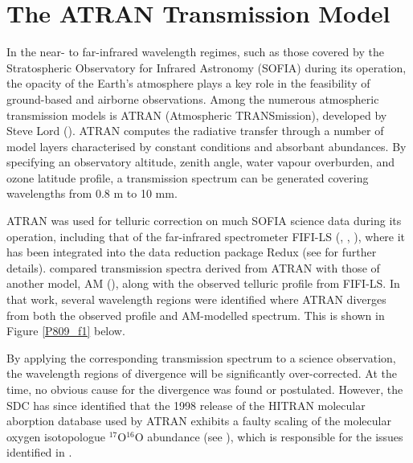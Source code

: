 \documentclass[11pt,twoside]{article}
\begin{document}



\section{The ATRAN Transmission Model}
In the near- to far-infrared wavelength regimes, such as those covered by the Stratospheric
Observatory for Infrared Astronomy (SOFIA) during
its operation, the opacity of the Earth's atmosphere plays a key role in the feasibility
of ground-based and airborne observations. Among the numerous atmospheric
transmission models is ATRAN (Atmospheric TRANSmission), developed by Steve Lord (\citet{P809_Lord_1992}). ATRAN
computes the radiative transfer through a number of model layers characterised by
constant conditions and absorbant abundances. By specifying an observatory altitude,
zenith angle, water vapour overburden, and ozone latitude profile, a transmission spectrum
can be generated covering wavelengths from 0.8 \textmu m to 10 mm.

ATRAN was used for telluric correction on much SOFIA science data during its operation,
including that of the far-infrared spectrometer FIFI-LS (\citet{FIFI_Fischer_2021},
\citet{FIFI_Iserlohe_2021}, \citet{FIFI_Iserlohe_2022}), where it has been integrated
into the data reduction package Redux (see \citet{P816_adassxxxvi} for further details).
\citet{FIFI_Fadda_2023} compared transmission spectra derived from ATRAN with those of
another model, AM (\citet{P809_Paine_2024}), along with the observed telluric profile from FIFI-LS. In that work, several
wavelength regions were identified where ATRAN diverges from both the observed profile and
AM-modelled spectrum. This is shown in Figure \ref{P809_f1} below.

By applying the corresponding transmission spectrum to a science observation, the wavelength
regions of divergence will be significantly over-corrected. At the time, no obvious cause
for the divergence was found or postulated. However, the SDC has since identified that the 1998
release of the HITRAN molecular aborption database used by ATRAN exhibits a faulty scaling of
the molecular oxygen isotopologue $^{17}$O$^{16}$O abundance (see \citet{ROTHMAN1998665}),
which is responsible for the issues identified in \citet{FIFI_Fadda_2023}.
\end{document}
